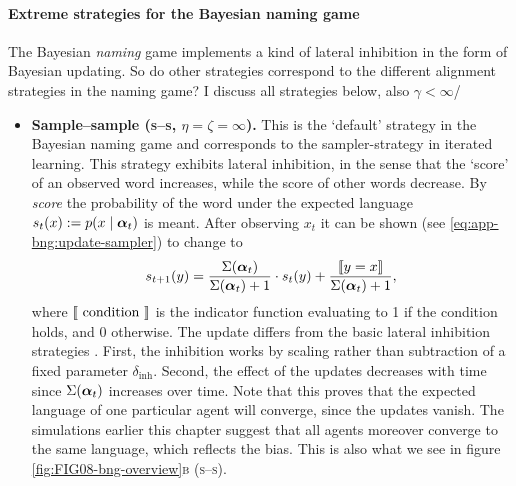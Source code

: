 \documentclass{../src/bcthesispart}
\begin{document}
\paragraph{Extreme strategies for the Bayesian naming game}

The Bayesian \emph{naming} game implements a kind of lateral inhibition in the form of Bayesian updating.
So do other strategies correspond to the different alignment strategies in the naming game?
I discuss all strategies below, also $\gamma < \infty$/
\begin{itemize}
\item \textbf{Sample--sample (\textsc{s--s}, $\eta=\zeta=\infty$).}
	This is the ‘default’ strategy in the Bayesian naming game and corresponds to the sampler-strategy in iterated learning.
	This strategy exhibits lateral inhibition, in the sense that the ‘score’ of an observed word increases, while the score of other words decrease.
	By \emph{score} the probability of the word under the expected language $s_t(x) := p(x \mid \boldsymbol{\mathbf{\alpha}}_t)$ is meant. After observing $x_t$ it can be shown (see \eqref{eq:app-bng:update-sampler}) to change to
	\begin{align}
		s_{t+1}(y) =
			\frac{\vectsum{\vect\alpha_t}}%
				{\vectsum{\vect\alpha_t} + 1} 
			\cdot s_t(y)
			+ \frac{\ind{y=x}}%
				{\vectsum{\vect\alpha_t} + 1},
	\end{align}
	where $\left\llbracket\text{ condition }\right\rrbracket$ is the indicator function evaluating to 1 if the condition holds, and 0 otherwise.
	The update differs from the basic lateral inhibition strategies \parencite[e.g.][]{Wellens2012}.
	First, the inhibition works by scaling rather than subtraction of a fixed parameter $\delta_{\text{inh}}$. 
	Second, the effect of the updates decreases with time since $\Sigma(\boldsymbol{\mathbf{\alpha}}_t)$ increases over time.
	Note that this proves that the expected language of one particular agent will converge, since the updates vanish.
	The simulations earlier this chapter suggest that all agents moreover converge to the same language, which reflects the bias.
	This is also what we see in figure \ref{fig:FIG08-bng-overview}\textsc{b} (\textsc{s--s}).


\end{itemize}
\end{document}
